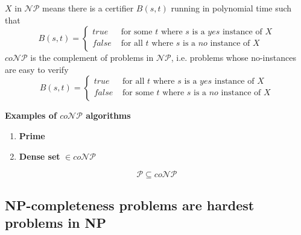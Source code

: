 \documentclass[11pt]{article}
\begin{document}
\begin{defn*}
    $X$ in $\mathcal{NP}$ means there is a certifier $B(s,t)$ running in polynomial time such that 
    \[
        B(s,t) = 
        \begin{cases}
            true & \text{ for some $t$ where $s$ is a $yes$ instance of $X$} \\
            false & \text{ for all $t$ where $s$ is a $no$ instance of $X$} \\ 
        \end{cases}
    \]
    $co\mathcal{NP}$ is the complement of problems in $\mathcal{NP}$, i.e. problems whose no-instances are easy to verify 
    \[
        B(s,t) = 
        \begin{cases}
            true & \text{ for all $t$ where $s$ is a $yes$ instance of $X$} \\
            false & \text{ for some $t$ where $s$ is a $no$ instance of $X$} \\ 
        \end{cases}
    \]
\end{defn*}

\begin{example}
    \textbf{Examples of $co\mathcal{NP}$ algorithms}
    \begin{enumerate}
        \item \textbf{Prime}
            \begin{algorithm}[H]

        \end{algorithm}
        \item \textbf{Dense set} $\in co\mathcal{NP}$
    \end{enumerate}
\end{example}

\begin{proposition*}
    \[
        \mathcal{P} \subseteq co\mathcal{NP}
    \]
\end{proposition*}



\subsection*{NP-completeness problems are hardest problems in NP}
\end{document}
